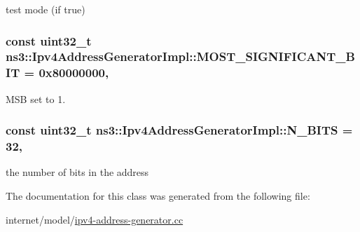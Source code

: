 test mode (if true) 

\subsubsection[{\texorpdfstring{M\+O\+S\+T\+\_\+\+S\+I\+G\+N\+I\+F\+I\+C\+A\+N\+T\+\_\+\+B\+IT}{MOST_SIGNIFICANT_BIT}}]{\setlength{\rightskip}{0pt plus 5cm}const uint32\+\_\+t ns3\+::\+Ipv4\+Address\+Generator\+Impl\+::\+M\+O\+S\+T\+\_\+\+S\+I\+G\+N\+I\+F\+I\+C\+A\+N\+T\+\_\+\+B\+IT = 0x80000000\hspace{0.3cm}{\ttfamily [static]}, {\ttfamily [private]}}\hypertarget{classns3_1_1Ipv4AddressGeneratorImpl_ad39d68d2d28c578b8c90be437c853c35}{}\label{classns3_1_1Ipv4AddressGeneratorImpl_ad39d68d2d28c578b8c90be437c853c35}


M\+SB set to 1. 

\subsubsection[{\texorpdfstring{N\+\_\+\+B\+I\+TS}{N_BITS}}]{\setlength{\rightskip}{0pt plus 5cm}const uint32\+\_\+t ns3\+::\+Ipv4\+Address\+Generator\+Impl\+::\+N\+\_\+\+B\+I\+TS = 32\hspace{0.3cm}{\ttfamily [static]}, {\ttfamily [private]}}\hypertarget{classns3_1_1Ipv4AddressGeneratorImpl_a76a2bff7838831dc3d1027f12e4fac85}{}\label{classns3_1_1Ipv4AddressGeneratorImpl_a76a2bff7838831dc3d1027f12e4fac85}


the number of bits in the address 



The documentation for this class was generated from the following file\+:\begin{DoxyCompactItemize}
\item 
internet/model/\hyperlink{ipv4-address-generator_8cc}{ipv4-\/address-\/generator.\+cc}\end{DoxyCompactItemize}
